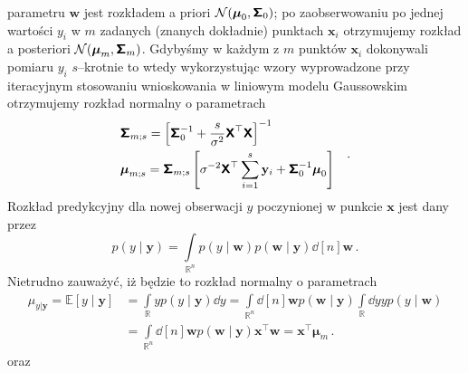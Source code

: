 \documentclass{myclass}
\begin{document}
parametru \(\mathbf{w}\) jest rozkładem a priori \(\mathcal{N}(\boldsymbol{\mu}_0,
\boldsymbol{\mathsf{\Sigma}}_0)\); po zaobserwowaniu po jednej wartości \(y_i\) w \(m\) zadanych (znanych
dokładnie) punktach \(\mathbf{x}_i\) otrzymujemy rozkład a posteriori
\(\mathcal{N}(\boldsymbol{\mu}_m, \boldsymbol{\mathsf{\Sigma}}_m)\). Gdybyśmy w każdym z \(m\) punktów
\(\mathbf{x}_i\) dokonywali pomiaru \(y_i\) \(s\)--krotnie to wtedy wykorzystując wzory wyprowadzone
przy iteracyjnym stosowaniu wnioskowania w liniowym modelu Gaussowskim otrzymujemy rozkład normalny
o parametrach
\begin{equation*}
    \begin{split}
        &\boldsymbol{\mathsf{\Sigma}}_{m;s} = \left[\boldsymbol{\mathsf{\Sigma}}_0^{-1} + \frac{s}{\sigma^2}\boldsymbol{\mathsf{X}}^\top\boldsymbol{\mathsf{X}}\right]^{-1}\\
        &\boldsymbol{\mu}_{m;s} = \boldsymbol{\mathsf{\Sigma}}_{m;s}\left[\sigma^{-2}\boldsymbol{\mathsf{X}}^\top\sum_{i=1}^s\mathbf{y}_i + \boldsymbol{\mathsf{\Sigma}}_0^{-1}\boldsymbol{\mu}_0\right]    
    \end{split}\quad.
\end{equation*} 
Rozkład predykcyjny dla nowej obserwacji \(y\) poczynionej w punkcie \(\mathbf{x}\) jest dany przez
\begin{equation*}
    p(y \mid \mathbf{y}) = \int\limits_{\mathbb{R}^n}p(y\mid\mathbf{w})p(\mathbf{w}\mid\mathbf{y}) \dd[n]\mathbf{w}\,.
\end{equation*}
Nietrudno zauważyć, iż będzie to rozkład normalny o parametrach
\begin{equation*}
    \begin{split}
        \mu_{y|\mathbf{y}} = \mathbb{E}[y\mid\mathbf{y}] &= \int\limits_{\mathbb{R}} y p(y\mid\mathbf{y}) \dd{y} = \int\limits_{\mathbb{R}^n}\dd[n]{\mathbf{w}} p(\mathbf{w}\mid\mathbf{y}) \int\limits_\mathbb{R}\dd{y} yp(y\mid\mathbf{w}) \\
        &= \int\limits_{\mathbb{R}^n}\dd[n]{\mathbf{w}} p(\mathbf{w}\mid\mathbf{y}) \mathbf{x}^\top\mathbf{w} = \mathbf{x}^\top\boldsymbol{\mu}_m\,.
    \end{split}
\end{equation*}
oraz
\end{document}
